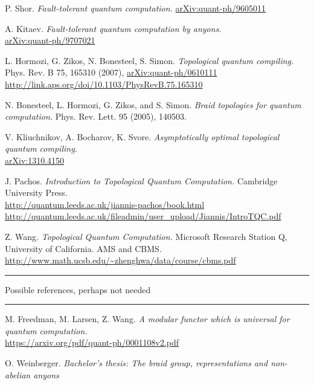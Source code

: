 \documentclass[a4paper,10pt,oneside]{book}
\theoremstyle{plain}
\theoremstyle{definition}
\theoremstyle{remark}
\begin{document}
{\begin{thebibliography}{99}
    P. Shor.
    \textit{Fault-tolerant quantum computation.}
    \href{https://arxiv.org/abs/quant-ph/9605011}{arXiv:quant-ph/9605011}

    A. Kitaev.
    \textit{Fault-tolerant quantum computation by anyons.}
    \\
    \href{https://arxiv.org/abs/quant-ph/9707021}{arXiv:quant-ph/9707021}

    L. Hormozi, G. Zikos, N. Bonesteel, S. Simon.
    \textit{Topological quantum compiling.}
    Phys. Rev. B 75, 165310 (2007), \href{https://arxiv.org/abs/quant-ph/0610111}{arXiv:quant-ph/0610111}
    \\
    \url{http://link.aps.org/doi/10.1103/PhysRevB.75.165310}

  \bibitem{}
    N. Bonesteel, L. Hormozi, G. Zikos, and S. Simon.
    \textit{Braid topologies for quantum computation.}
    Phys. Rev. Lett. 95 (2005), 140503.

    V. Kliuchnikov, A. Bocharov, K. Svore.
    \textit{Asymptotically optimal topological quantum compiling.}
    \\
    \href{https://arxiv.org/abs/1310.4150}{arXiv:1310.4150}

    J. Pachos.
    \textit{Introduction to Topological Quantum Computation.}
    Cambridge University Press.
    \\
    \url{http://quantum.leeds.ac.uk/jiannis-pachos/book.html}
    \\
    \url{http://quantum.leeds.ac.uk/fileadmin/user_upload/Jiannis/IntroTQC.pdf}

    Z. Wang.
    \textit{Topological Quantum Computation.}
    Microsoft Research Station Q, University of California.
    AMS and CBMS.
    \url{http://www.math.ucsb.edu/~zhenghwa/data/course/cbms.pdf}

  \vspace{1cm}
  \hrule
  Possible references, perhaps not needed
  \hrule

  \bibitem{}
    M. Freedman, M. Larsen, Z. Wang.
    \textit{A modular functor which is universal for quantum computation.}
    \\
    \url{https://arxiv.org/pdf/quant-ph/0001108v2.pdf}


    O. Weinberger.
    \textit{Bachelor's thesis: The braid group, representations and non-abelian anyons}


\end{thebibliography}}
\end{document}
